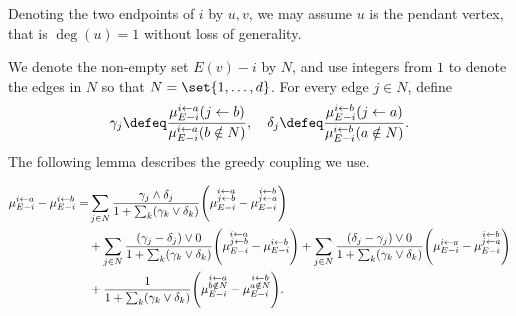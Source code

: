 Denoting the two endpoints of $i$ by $u, v$, we may assume $u$ is the pendant vertex, that is $\deg(u) = 1$ without loss of generality.
    
We denote the non-empty set $E(v)-i$ by $N$, and use integers from $1$ to denote the edges in $N$ so that $N = \set{1, \ldots, d}$. For every edge $j\in N$, define
\begin{align*}
    \gamma_j\defeq \frac{\pab}{\pan}, \quad
    \delta_j\defeq \frac{\pba}{\pbn}.
\end{align*}
The following lemma describes the greedy coupling we use.
\begin{lemma}
    \begin{align*}
        \ma-\mb
          =&\sum_{j\in N}\frac{\gamma_j\wedge\delta_j}{\zzz}\Bigg(\mab - \mba\Bigg)
        \\&+\sum_{j\in N}\frac{(\gamma_j-\delta_j)\vee 0}{\zzz}\Bigg(\mab-\mb\Bigg)
           +\sum_{j\in N}\frac{(\delta_j-\gamma_j)\vee 0}{\zzz}\Bigg(\ma-\mba\Bigg)
        \\&+\frac{1}{\zzz}\Bigg(\man-\mbn\Bigg).
    \end{align*}
\end{lemma}
